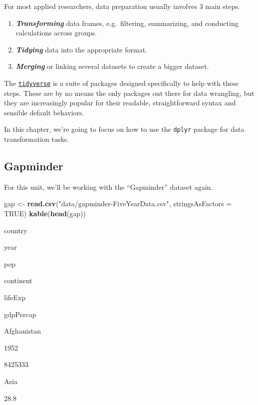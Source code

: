 \documentclass[]{book}
\newenvironment{Shaded}{\begin{snugshade}}{\end{snugshade}}
\newcommand{\KeywordTok}[1]{\textcolor[rgb]{0.13,0.29,0.53}{\textbf{#1}}}
\newcommand{\DataTypeTok}[1]{\textcolor[rgb]{0.13,0.29,0.53}{#1}}
\newcommand{\StringTok}[1]{\textcolor[rgb]{0.31,0.60,0.02}{#1}}
\newcommand{\OtherTok}[1]{\textcolor[rgb]{0.56,0.35,0.01}{#1}}
\newcommand{\NormalTok}[1]{#1}
\providecommand{\tightlist}{%
  \setlength{\itemsep}{0pt}\setlength{\parskip}{0pt}}
\begin{document}
For most applied researchers, data preparation usually involves 3 main
steps.

\begin{enumerate}
\def\labelenumi{\arabic{enumi}.}
\tightlist
\item
  \textbf{\emph{Transforming}} data frames, e.g.~filtering, summarizing,
  and conducting calculations across groups.
\item
  \textbf{\emph{Tidying}} data into the appropriate format.
\item
  \textbf{\emph{Merging}} or linking several datasets to create a bigger
  dataset.
\end{enumerate}

The \href{https://www.tidyverse.org/}{\texttt{tidyverse}} is a suite of
packages designed specifically to help with these steps. These are by no
means the only packages out there for data wrangling, but they are
increasingly popular for their readable, straightforward syntax and
sensible default behaviors.

In this chapter, we're going to focus on how to use the \texttt{dplyr}
package for data transformation tasks.

\subsection{Gapminder}\label{gapminder}

For this unit, we'll be working with the ``Gapminder'' dataset again.

\begin{Shaded}
\begin{Highlighting}[]
\NormalTok{gap <-}\StringTok{ }\KeywordTok{read.csv}\NormalTok{(}\StringTok{"data/gapminder-FiveYearData.csv"}\NormalTok{, }\DataTypeTok{stringsAsFactors =} \OtherTok{TRUE}\NormalTok{)}
\KeywordTok{kable}\NormalTok{(}\KeywordTok{head}\NormalTok{(gap))}
\end{Highlighting}
\end{Shaded}

country

year

pop

continent

lifeExp

gdpPercap

Afghanistan

1952

8425333

Asia

28.8
\end{document}
